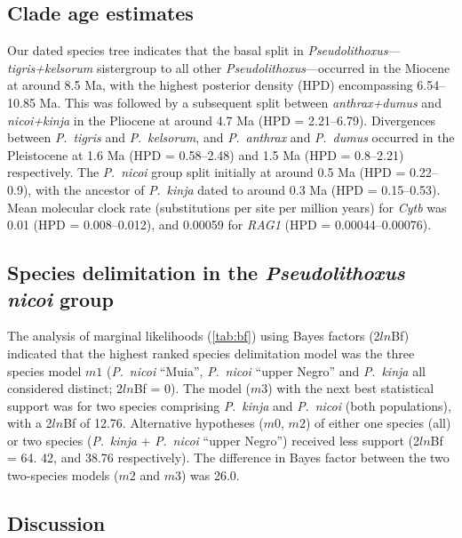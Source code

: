 \documentclass[12pt]{article}
\begin{document}
\subsection*{Clade age estimates}

Our dated species tree indicates that the basal split in \emph{Pseudolithoxus}---\emph{tigris+kelsorum} sistergroup to all other \emph{Pseudolithoxus}---occurred in the Miocene at around 8.5 Ma, with the highest posterior density (HPD) encompassing 6.54--10.85 Ma. %
This was followed by a subsequent split between \emph{anthrax+dumus} and \emph{nicoi+kinja} in the Pliocene at around 4.7 Ma (HPD = 2.21--6.79). %
Divergences between \emph{P}.\ \emph{tigris} and \emph{P}.\ \emph{kelsorum}, and \emph{P}.\ \emph{anthrax} and \emph{P}.\ \emph{dumus} occurred in the Pleistocene at 1.6 Ma (HPD = 0.58--2.48) and 1.5 Ma (HPD = 0.8--2.21) respectively. %
The \emph{P}.\ \emph{nicoi} group split initially at around 0.5 Ma (HPD = 0.22–0.9), with the ancestor of \emph{P}.\ \emph{kinja} dated to around 0.3 Ma (HPD = 0.15–0.53). %
Mean molecular clock rate (substitutions per site per million years) for \emph{Cytb} was 0.01 (HPD = 0.008--0.012), and 0.00059 for \emph{RAG1} (HPD = 0.00044--0.00076).

\subsection*{Species delimitation in the \emph{Pseudolithoxus nicoi} group}

The analysis of marginal likelihoods (\autoref{tab:bf}) using Bayes factors (2$ln$Bf) indicated that the highest ranked species delimitation model was the three species model $m1$ (\emph{P}.\ \emph{nicoi} ``Muia'', \emph{P}.\ \emph{nicoi} ``upper Negro'' and \emph{P}.\ \emph{kinja} all considered distinct; 2$ln$Bf = 0). %
The model ($m3$) with the next best statistical support was for two species comprising \emph{P}.\ \emph{kinja} and \emph{P}.\ \emph{nicoi} (both populations), with a 2$ln$Bf of 12.76. %
Alternative hypotheses ($m0$, $m2$) of either one species (all) or two species (\emph{P}.\ \emph{kinja} + \emph{P}.\ \emph{nicoi} ``upper Negro'') received less support (2$ln$Bf = 64. 42, and 38.76 respectively). %
The difference in Bayes factor between the two two-species models ($m2$ and $m3$) was 26.0.%

\subsection*{Discussion}
\end{document}
